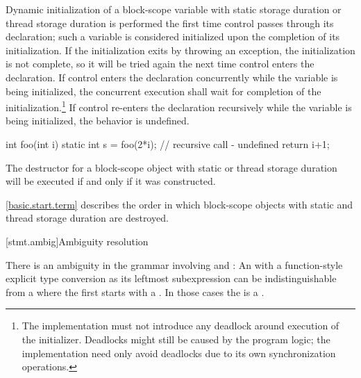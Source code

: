 \pnum
{}%
%
%
%
Dynamic initialization of a block-scope variable with
static storage duration or
thread storage duration is performed
the first time control passes through its declaration; such a variable is
considered initialized upon the completion of its initialization. If the
initialization exits by throwing an exception, the initialization is not
complete, so it will be tried again the next time control enters the
declaration.
If control enters the declaration concurrently while the variable is
being initialized, the concurrent execution shall wait for completion
of the initialization.\footnote{The implementation must not introduce
any deadlock around execution of the initializer. Deadlocks might
still be caused by the program logic; the implementation need only
avoid deadlocks due to its own synchronization operations.} If control
re-enters the declaration recursively while
the variable is being initialized, the behavior is undefined.
\begin{example}

\begin{codeblock}
int foo(int i) {
  static int s = foo(2*i);      // recursive call - undefined
  return i+1;
}
\end{codeblock}
\end{example}

\pnum
{}%
The destructor for a block-scope object with static or thread storage duration will be
executed if and only if it was constructed.
\begin{note}
\ref{basic.start.term} describes the order in which block-scope objects with
static and thread storage duration are destroyed.
\end{note}

[stmt.ambig]{Ambiguity resolution}%

\pnum
There is an ambiguity in the grammar involving
 and : An
 with a function-style explicit type
conversion as its leftmost subexpression can be
indistinguishable from a  where the first
 starts with a \tcode{(}. In those cases the
 is a .

